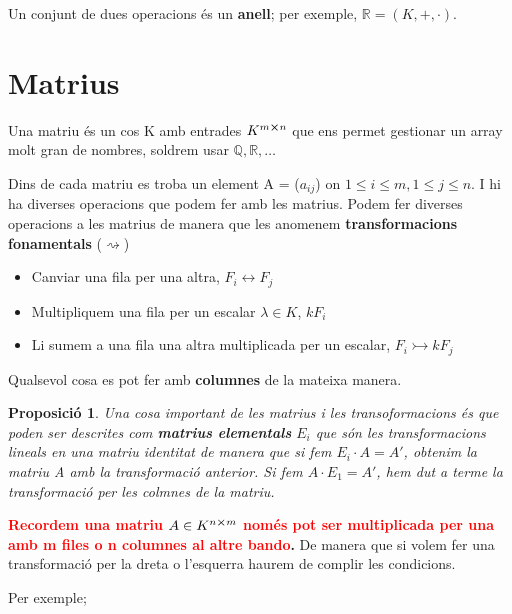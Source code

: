 \documentclass[12pt]{article}
\newtheorem{proposicio}{Proposició}[section]
\newcommand{\R}{\mathbb{R}}
\newcommand{\Q}{\mathbb{Q}}
\begin{document}
Un conjunt de dues operacions és un \textbf{anell}; per exemple, $\R = (K, +, \cdot)$.

\section{Matrius}

Una matriu és un cos K amb entrades $K^{m\cross n}$ que ens permet gestionar un array molt gran de nombres, soldrem usar $\Q, \R, \dots$

Dins de cada matriu es troba un element A = ($a_{ij}$) on $ 1 \leq i \leq m, 1 \leq j \leq n$. I hi ha diverses operacions que podem fer amb les matrius. Podem fer diverses operacions a les matrius de manera que les anomenem \textbf{transformacions fonamentals} ($\rightsquigarrow$)

\begin{itemize}
    \item Canviar una fila per una altra, $F_i \leftrightarrow F_j$
    \item Multipliquem una fila per un escalar $\lambda \in K$, $kF_i$
    \item Li sumem a una fila una altra multiplicada per un escalar, $F_i \rightarrowtail kF_j$
\end{itemize}

Qualsevol cosa es pot fer amb \textbf{columnes} de la mateixa manera. 

\begin{proposicio}
    Una cosa important de les matrius i les transoformacions és que poden ser descrites com \textbf{matrius elementals} $E_i$ que són les transformacions lineals en una matriu identitat de manera que si fem $E_i \cdot A = A'$, obtenim la matriu A amb la transformació anterior. Si fem $A\cdot E_1 = A'$, hem dut a terme la transformació per les colmnes de la matriu.
\end{proposicio}
\textbf{\textcolor{red}{Recordem una matriu $A\in K^{n\cross m}$ només pot ser multiplicada per una amb m files o n columnes al altre bando}.} De manera que si volem fer una transformació per la dreta o l'esquerra haurem de complir les condicions.

Per exemple;
\end{document}
